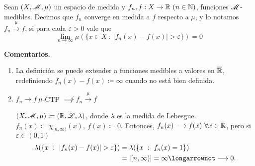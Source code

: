 \begin{definition}
	Sean $(X, \mathscr{M}, \mu)$ un espacio de medida y $f_{n}, f : X \to \mathbb{R} \ (n \in \mathbb{N})$, funciones $\mathscr{M}$-medibles. Decimos que $f_{n}$ converge en medida a $f$ respecto a $\mu$, y lo notamos $f_{n} \stackrel{\mu}{\longrightarrow} f$, si para cada $\varepsilon > 0$ vale que
	\[ \lim_{n \to \infty} \mu(\{x \in X \ : \ | f_{n}(x) - f(x) | > \varepsilon\}) = 0 \]
\end{definition}
\medskip
\noindent \textbf{Comentarios.}
\begin{enumerate}
	\item La definición se puede extender a funciones medibles a valores en $\overline{\mathbb{R}}$, redefiniendo $f_{n}(x) - f(x) \coloneq \infty$ cuando no está bien definida.

	\item $f_{n} \longrightarrow f \ \mu$-CTP $\not\implies f_{n} \stackrel{\mu}{\longrightarrow} f$
	\begin{eg}
		$(X, \mathscr{M}, \mu) \coloneq (\mathbb{R}, \mathscr{L}, \lambda)$, donde $\lambda$ es la medida de Lebesgue. $f_{n}(x) \coloneq \chi_{[n,\infty)}(x),\ f(x) \coloneq 0$. Entonces, $f_n(x) \longrightarrow f(x) \ \forall x \in \R$, pero si $\varepsilon \in (0,1)$
		\begin{align*}
			\lambda(\{x \ : \ | f_n(x) - f(x) | > \varepsilon\}) &= \lambda(\{x \ : \ f_n(x) = 1\}) \\
			&= | [n, \infty) | = \infty \longarrownot\longrightarrow 0.
		\end{align*}
	\end{eg}


\end{enumerate}
